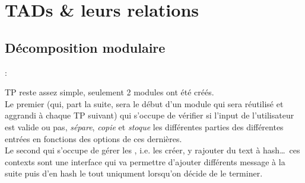 \section{TADs \& leurs relations}
\subsection{Décomposition modulaire}


\begin{frame}{\sn : \ssn}
%

TP reste assez simple, seulement 2 modules ont été créés.\\ Le premier  (qui, part la suite, sera le début d'un module  qui sera réutilisé et aggrandi à chaque TP suivant) qui s'occupe de vérifier si l'input de l'utilisateur est valide ou pas, \textit{sépare}, \textit{copie} et \textit{stoque} les différentes parties des différentes entrées en fonctions des options de ces dernières.\\


\vspace{0.5cm}
Le second  qui s'occupe de gérer les , i.e. les créer, y rajouter du text à hash\ldots \(\, \)
ces contexts sont une interface qui va permettre d'ajouter différents message à la suite puis d'en hash le tout uniqument lorsqu'on
décide de le terminer.

\end{frame}

